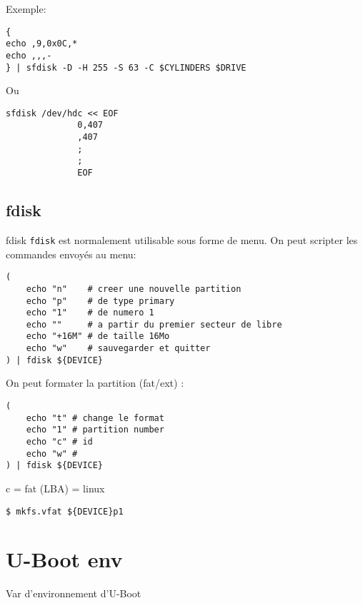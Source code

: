 \documentclass[compress]{beamer}
\begin{document}
\begin{frame}[fragile]
Exemple:
\begin{lstlisting}[style=shell]
{
echo ,9,0x0C,*
echo ,,,-
} | sfdisk -D -H 255 -S 63 -C $CYLINDERS $DRIVE
\end{lstlisting}
Ou
\begin{lstlisting}[style=shell]
sfdisk /dev/hdc << EOF
              0,407
              ,407
              ;
              ;
              EOF
\end{lstlisting}
\end{frame}


\subsection{fdisk}

\begin{frame}[fragile]{fdisk}
\texttt{fdisk} est normalement utilisable sous forme de menu.\newline
On peut scripter les commandes envoyés au menu:
\begin{lstlisting}[style=shell]
(
	echo "n"    # creer une nouvelle partition
	echo "p"    # de type primary
	echo "1"    # de numero 1
	echo ""     # a partir du premier secteur de libre
	echo "+16M" # de taille 16Mo
	echo "w"    # sauvegarder et quitter
) | fdisk ${DEVICE}
\end{lstlisting}
\end{frame}

\begin{frame}[fragile]
On peut formater la partition (fat/ext) :
\begin{lstlisting}[style=shell]
(
	echo "t" # change le format
	echo "1" # partition number
	echo "c" # id
	echo "w" #
) | fdisk ${DEVICE}
\end{lstlisting}
c = fat (LBA) = linux
\begin{lstlisting}[style=shell]
$ mkfs.vfat ${DEVICE}p1
\end{lstlisting}
\end{frame}


\section{U-Boot env}
\begin{frame}[fragile]
\huge{Var d'environnement d'U-Boot}
\end{frame}
\end{document}
